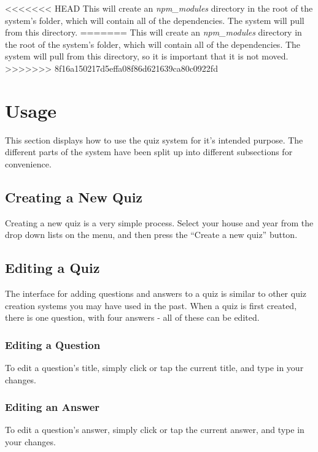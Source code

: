 <<<<<<< HEAD
This will create an \textit{npm\_modules} directory in the root of the system's folder, which will contain all of the dependencies. The system will pull from this directory.
=======
This will create an \textit{npm\_modules} directory in the root of the system's folder, which will contain all of the dependencies. The system will pull from this directory, so it is important that it is not moved.
>>>>>>> 8f16a150217d5effa08f86d621639ca80c0922fd


\section{Usage} %
\label{sec:usage}
This section displays how to use the quiz system for it's intended purpose. The different parts of the system have been split up into different subsections for convenience.

\subsection{Creating a New Quiz} %
\label{sub:creating_a_quiz}
Creating a new quiz is a very simple process. Select your house and year from the drop down lists on the menu, and then press the ``Create a new quiz'' button.

\subsection{Editing a Quiz} %
\label{sub:editing_a_quiz}
The interface for adding questions and answers to a quiz is similar to other quiz creation systems you may have used in the past. When a quiz is first created, there is one question, with four answers - all of these can be edited.

\subsubsection{Editing a Question} %
\label{ssub:editing_a_question}
To edit a question's title, simply click or tap the current title, and type in your changes.

\subsubsection{Editing an Answer} %
\label{ssub:editing_an_answer}
To edit a question's answer, simply click or tap the current answer, and type in your changes.

